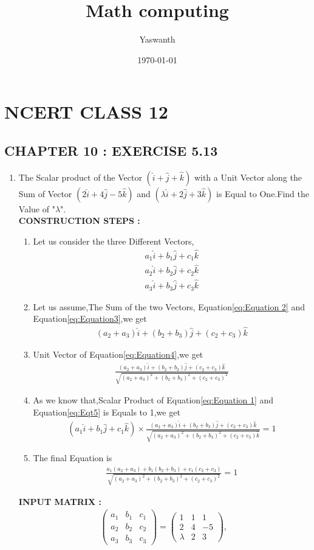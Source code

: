 \documentclass[11pt, a4paper]{article}
\title{ Math computing}
\author{ Yaswanth }
\date{\today}
\newcommand{\myvec}[1]{\ensuremath{\begin{pmatrix}#1\end{pmatrix}}}
\begin{document}
\section*{NCERT CLASS 12}
\subsection*{CHAPTER 10 : EXERCISE 5.13}
\begin{enumerate}
\item The Scalar product of the Vector $(\hat{i}+\hat{j}+\hat{k})$ with a Unit Vector along the Sum of Vector $(2\hat{i}+4\hat{j}-5\hat{k})$ and $(\lambda \hat{i}+2\hat{j}+3\hat{k})$ is Equal to One.Find the Value of "$\lambda$". 
\\

\textbf{CONSTRUCTION STEPS :}
\begin{enumerate}
    \item Let us consider the three Different Vectors,
    \begin{align}
        a_1\hat{i}+b_1\hat{j}+c_1\hat{k} \label{eq:Equation 1}\\
                a_2\hat{i}+b_2\hat{j}+c_2\hat{k} \label{eq:Equation 2}\\
        a_3\hat{i}+b_3\hat{j}+c_3\hat{k} \label{eq:Equation3}
    \end{align}
     \item Let us assume,The Sum of the two Vectors, Equation\eqref{eq:Equation 2} and Equation\eqref{eq:Equation3},we get \begin{align}
         (a_2+a_3)\hat{i}+(b_2+b_3)\hat{j}+(c_2+c_3)\hat{k}\label{eq:Equation4}   
         \end{align}
     \item Unit Vector of Equation\eqref{eq:Equation4},we get
      \begin{align}
          \frac{(a_2+a_3)\hat{i}+(b_2+b_3)\hat{j}+(c_2+c_3)\hat{k}}{\sqrt{(a_2+a_3)^2+(b_2+b_3)^2+(c_2+c_3)^2}} \label{eq:Eqt5}
      \end{align}
      \item As we know that,Scalar Product of Equation\eqref{eq:Equation 1} and Equation\eqref{eq:Eqt5} is Equals to 1,we get
      \begin{align}
          (a_1\hat{i}+b_1\hat{j}+c_1\hat{k})\times\frac{(a_2+a_3)\hat{i}+(b_2+b_3)\hat{j}+(c_2+c_3)\hat{k}}{\sqrt{(a_2+a_3)^2+(b_2+b_3)^2+(c_2+c_3)\hat{k}}} = 1\label{eq:Eqt6}
      \end{align}
      \item The final Equation is 
      \begin{align}
          \frac{a_1(a_2+a_3)+b_1(b_2+b_3)+c_1(c_2+c_3)}{\sqrt{(a_2+a_3)^2+(b_2+b_3)^2+(c_2+c_3)^2}}\label{eq:Eqt7}=1
      \end{align}
\end{enumerate}
\textbf{INPUT MATRIX :}
\begin{align}
 \myvec{a_1&b_1&c_1\\a_2&b_2&c_2\\a_3&b_3&c_3}=\myvec{1 & 1 & 1\\ 2 & 4& -5 \\ \lambda &2 &3},\,
\end{align}
\end{enumerate}
\end{document}
